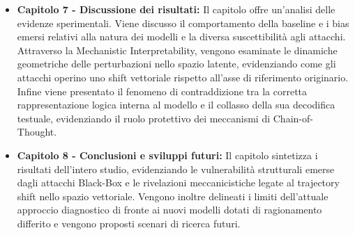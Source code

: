 \begin{itemize}
    \item \textbf{Capitolo 7 - Discussione dei risultati:} Il capitolo offre un'analisi delle evidenze sperimentali. Viene discusso il comportamento della baseline e i bias emersi relativi alla natura dei modelli e la diversa suscettibilità agli attacchi. Attraverso la Mechanistic Interpretability, vengono esaminate le dinamiche geometriche delle perturbazioni nello spazio latente, evidenziando come gli attacchi operino uno shift vettoriale rispetto all'asse di riferimento originario. Infine viene presentato il fenomeno di contraddizione tra la corretta rappresentazione logica interna al modello e il collasso della sua decodifica testuale, evidenziando il ruolo protettivo dei meccanismi di Chain-of-Thought.
    \item \textbf{Capitolo 8 - Conclusioni e sviluppi futuri:} Il capitolo sintetizza i risultati dell'intero studio, evidenziando le vulnerabilità strutturali emerse dagli attacchi Black-Box e le rivelazioni meccanicistiche legate al trajectory shift nello spazio vettoriale. Vengono inoltre delineati i limiti dell'attuale approccio diagnostico di fronte ai nuovi modelli dotati di ragionamento differito e vengono proposti scenari di ricerca futuri.
\end{itemize} 


